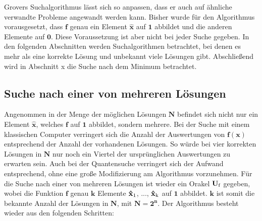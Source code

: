 Grovers Suchalgorithmus lässt sich so anpassen, dass er auch auf ähnliche verwandte Probleme angewandt werden kann.
Bisher wurde für den Algorithmus vorausgesetzt, dass $\mathbf{f}$ genau ein Element $\mathbf{\hat x}$ auf $\mathbf{1}$ abbildet und die anderen Elemente auf $\mathbf{0}$. 
Diese Voraussetzung ist aber nicht bei jeder Suche gegeben. In den folgenden Abschnitten werden Suchalgorithmen betrachtet, bei denen es mehr als eine korrekte Lösung und unbekannt viele Lösungen gibt. 
Abschließend wird in Abschnitt x die Suche nach dem Minimum betrachtet. 

\subsection{Suche nach einer von mehreren Lösungen}

Angenommen in der Menge der möglichen Lösungen $\mathbf{N}$ befindet sich nicht nur ein Element $\mathbf{\hat x}$, welches $\mathbf{f}$ auf $\mathbf{1}$ abbildet, sondern mehrere. 
Bei der Suche mit einem klassischen Computer verringert sich die Anzahl der Auswertungen von $\mathbf{f(x)}$ entsprechend der Anzahl der vorhandenen Lösungen. So würde bei vier korrekten Lösungen in $\mathbf{N}$ nur noch ein Viertel der ursprünglichen Auswertungen zu erwarten sein.
Auch bei der Quantensuche verringert sich der Aufwand entsprechend, ohne eine große Modifizierung am Algorithmus vorzunehmen.
Für die Suche nach einer von mehreren Lösungen ist wieder ein Orakel $\mathbf{U \textsubscript{f}}$ gegeben, wobei die Funktion $\mathbf{f}$ genau $\mathbf{k}$ Elemente $\mathbf{\hat x \textsubscript{1}}$, ..., $\mathbf{\hat x \textsubscript{k}}$ auf $\mathbf{1}$ abbildet. $\mathbf{k}$ ist somit die bekannte Anzahl der Lösungen in $\mathbf{N}$, mit $\mathbf{N = 2^n}$. 
Der Algorithmus besteht wieder aus den folgenden Schritten:
